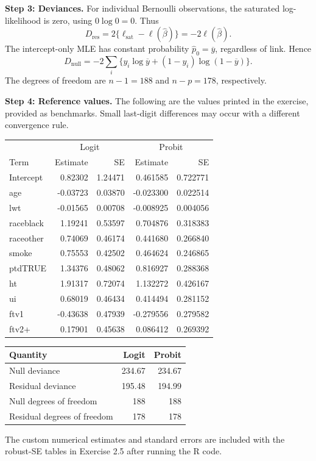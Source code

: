 \documentclass[answers,12pt,addpoints]{exam}
\begin{document}
\begin{questions}
\begin{solution}
\textbf{Step 3: Deviances.}
For individual Bernoulli observations, the saturated log-likelihood is zero,
using $0\log0=0$. Thus
\[
D_{\mathrm{res}}=2\{\ell_{\mathrm{sat}}-\ell(\widehat\beta)\}
=-2\ell(\widehat\beta).
\]
The intercept-only MLE has constant probability $\widehat p_0=\overline y$,
regardless of link. Hence
\[
D_{\mathrm{null}}=-2\sum_i\{y_i\log\overline y
+(1-y_i)\log(1-\overline y)\}.
\]
The degrees of freedom are $n-1=188$ and $n-p=178$, respectively.

\textbf{Step 4: Reference values.}
The following are the values printed in the exercise, provided as benchmarks.
Small last-digit differences may occur with a different convergence rule.
\begin{center}
\small
\begin{tabular}{lrrrr}
\toprule
&\multicolumn{2}{c}{Logit}&\multicolumn{2}{c}{Probit}\\
Term&Estimate&SE&Estimate&SE\\
\midrule
Intercept&0.82302&1.24471&0.461585&0.722771\\
age&-0.03723&0.03870&-0.023300&0.022514\\
lwt&-0.01565&0.00708&-0.008925&0.004056\\
raceblack&1.19241&0.53597&0.704876&0.318383\\
raceother&0.74069&0.46174&0.441680&0.266840\\
smoke&0.75553&0.42502&0.464624&0.246865\\
ptdTRUE&1.34376&0.48062&0.816927&0.288368\\
ht&1.91317&0.72074&1.132272&0.426167\\
ui&0.68019&0.46434&0.414494&0.281152\\
ftv1&-0.43638&0.47939&-0.279556&0.279582\\
ftv2+&0.17901&0.45638&0.086412&0.269392\\
\bottomrule
\end{tabular}
\end{center}
\begin{center}
\begin{tabular}{lrr}
\toprule
Quantity&Logit&Probit\\
\midrule
Null deviance&234.67&234.67\\
Residual deviance&195.48&194.99\\
Null degrees of freedom&188&188\\
Residual degrees of freedom&178&178\\
\bottomrule
\end{tabular}
\end{center}
The custom numerical estimates and standard errors are included with the
robust-SE tables in Exercise 2.5 after running the R code.
\end{solution}


\end{questions}
\end{document}
